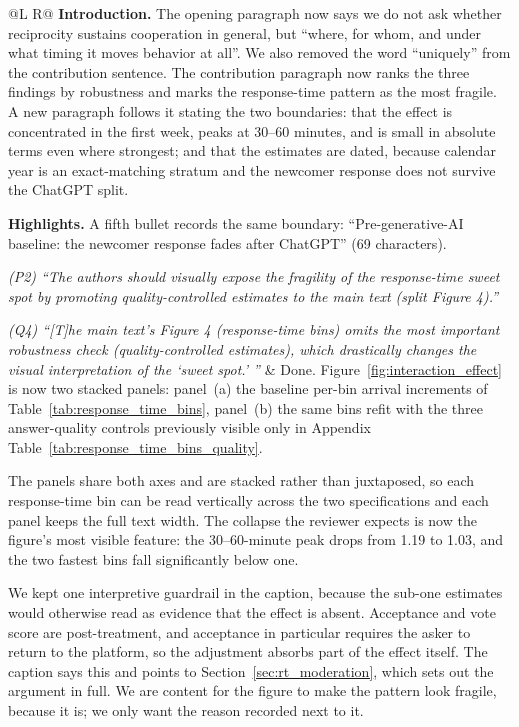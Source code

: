 \documentclass[11pt]{article}
\begin{document}
\begin{longtable}{@{}L R@{}}
\textbf{Introduction.} The opening paragraph now says we do not ask whether reciprocity sustains cooperation in general, but ``where, for whom, and under what timing it moves behavior at all''. We also removed the word ``uniquely'' from the contribution sentence. The contribution paragraph now ranks the three findings by robustness and marks the response-time pattern as the most fragile. A new paragraph follows it stating the two boundaries: that the effect is concentrated in the first week, peaks at 30--60 minutes, and is small in absolute terms even where strongest; and that the estimates are dated, because calendar year is an exact-matching stratum and the newcomer response does not survive the ChatGPT split.

\textbf{Highlights.} A fifth bullet records the same boundary: ``Pre-generative-AI baseline: the newcomer response fades after ChatGPT'' (69 characters).\\
\midrule

\textit{(P2) ``The authors should visually expose the fragility of the response-time sweet spot by promoting quality-controlled estimates to the main text (split Figure 4).''}

\textit{(Q4) ``[T]he main text's Figure 4 (response-time bins) omits the most important robustness check (quality-controlled estimates), which drastically changes the visual interpretation of the `sweet spot.' ''} &
Done. Figure~\ref{fig:interaction_effect} is now two stacked panels: panel~(a) the baseline per-bin arrival increments of Table~\ref{tab:response_time_bins}, panel~(b) the same bins refit with the three answer-quality controls previously visible only in Appendix Table~\ref{tab:response_time_bins_quality}.

The panels share both axes and are stacked rather than juxtaposed, so each response-time bin can be read vertically across the two specifications and each panel keeps the full text width. The collapse the reviewer expects is now the figure's most visible feature: the 30--60-minute peak drops from 1.19 to 1.03, and the two fastest bins fall significantly below one.

We kept one interpretive guardrail in the caption, because the sub-one estimates would otherwise read as evidence that the effect is absent. Acceptance and vote score are post-treatment, and acceptance in particular requires the asker to return to the platform, so the adjustment absorbs part of the effect itself. The caption says this and points to Section~\ref{sec:rt_moderation}, which sets out the argument in full. We are content for the figure to make the pattern look fragile, because it is; we only want the reason recorded next to it.


\end{longtable}
\end{document}
